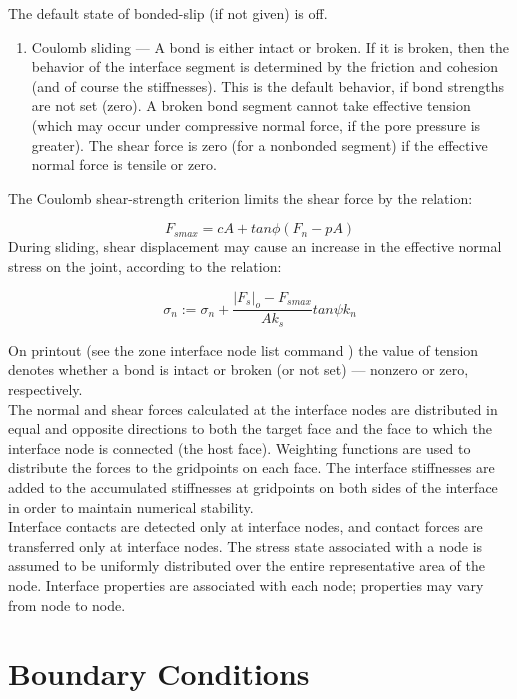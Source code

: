 \documentclass[a4paper, nobind]{templates/ociamthesis}
\providecommand{\tightlist}{%
  \setlength{\itemsep}{0pt}\setlength{\parskip}{0pt}}
\begin{document}
The default state of bonded-slip (if not given) is off.

\begin{enumerate}
\def\labelenumi{\arabic{enumi}.}
\setcounter{enumi}{2}
\tightlist
\item
  Coulomb sliding --- A bond is either intact or broken. If it is
  broken, then the behavior of the interface segment is determined by
  the friction and cohesion (and of course the stiffnesses). This is
  the default behavior, if bond strengths are not set (zero). A broken
  bond segment cannot take effective tension (which may occur under
  compressive normal force, if the pore pressure is greater). The
  shear force is zero (for a nonbonded segment) if the effective
  normal force is tensile or zero.\\
\end{enumerate}

The Coulomb shear-strength criterion limits the shear force by the
relation:

\[ F_{smax} = c A + tan\phi (F_n - pA)\] During sliding, shear
displacement may cause an increase in the effective normal stress on the
joint, according to the relation:

\[\sigma_n := \sigma_n + \frac{|F_s|_o - F_{smax}}{A k_s} tan\psi k_n\]

On printout (see the zone interface node list command ) the value of
tension denotes whether a bond is intact or broken (or not set) ---
nonzero or zero, respectively.\\

The normal and shear forces calculated at the interface nodes are
distributed in equal and opposite directions to both the target face and
the face to which the interface node is connected (the host face).
Weighting functions are used to distribute the forces to the gridpoints
on each face. The interface stiffnesses are added to the accumulated
stiffnesses at gridpoints on both sides of the interface in order to
maintain numerical stability.\\

Interface contacts are detected only at interface nodes, and contact
forces are transferred only at interface nodes. The stress state
associated with a node is assumed to be uniformly distributed over the
entire representative area of the node. Interface properties are
associated with each node; properties may vary from node to node.

\hypertarget{boundary-conditions}{%
\section{Boundary Conditions}\label{boundary-conditions}}
\end{document}
